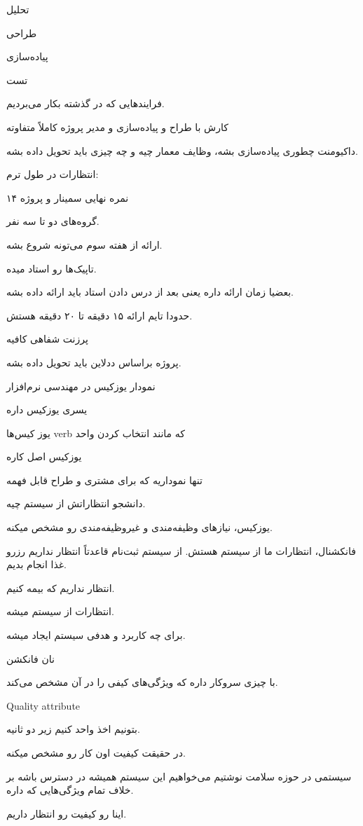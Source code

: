 تحلیل

طراحی

پیاده‌سازی

تست

فرایند‌هایی که در گذشته بکار می‌بردیم.

کارش با طراح و پیاده‌سازی و مدیر پروژه کاملاً متفاوته

داکیومنت چطوری پیاده‌سازی بشه، وظایف معمار چیه و چه چیزی باید تحویل داده بشه.


انتظارات در طول ترم:

۱۴ نمره نهایی
سمینار و پروژه

گروه‌های دو تا سه نفر.

ارائه از هفته سوم می‌تونه شروع بشه.

تاپیک‌ها رو استاد میده.

بعضیا زمان ارائه داره یعنی بعد از درس دادن استاد باید ارائه داده بشه.

حدودا تایم ارائه ۱۵ دقیقه تا ۲۰ دقیقه هستش.

پرزنت شفاهی کافیه

پروژه براساس ددلاین باید تحویل داده بشه.

نمودار یوزکیس در مهندسی نرم‌افزار

یسری یوزکیس داره

یوز کیس‌ها verb که مانند انتخاب کردن واحد

یوزکیس اصل کاره

تنها نموداریه که برای مشتری و طراح قابل فهمه

دانشجو انتظاراتش از سیستم چیه.

یوزکیس، نیاز‌های وظیفه‌مندی و غیر‌وظیفه‌مندی رو مشخص میکنه.

فانکشنال، انتظارات ما از سیستم هستش. از سیستم ثبت‌نام قاعدتاً انتظار نداریم رزرو
غذا انجام بدیم.

انتظار نداریم که بیمه کنیم.

انتظارات از سیستم میشه.

برای چه کاربرد و هدفی سیستم ایجاد میشه.

نان فانکشن

با چیزی سروکار داره که ویژگی‌های کیفی را در آن مشخص می‌کند.

Quality attribute

بتونیم اخذ واحد کنیم زیر دو ثانیه.

در حقیقت کیفیت اون کار رو مشخص میکنه.

سیستمی در حوزه سلامت نوشتیم می‌خواهیم این سیستم همیشه در دسترس باشه بر خلاف تمام
ویژگی‌هایی که داره.

اینا رو کیفیت رو انتظار داریم.

